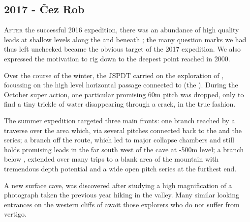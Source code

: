 \newpage
  
\begin{tcolorbox}

\chapter{2017 - Čez Rob}
	
	\lettrine{A}{fter} the successful 2016 expedition, there was an abundance of high quality leads at shallow levels along the  and beneath ; the many question marks we had thus left unchecked became the obvious target of the 2017 expedition. We also expressed the motivation to rig down to the deepest point reached in 2000.

	Over the course of the winter, the JSPDT carried on the exploration of , focussing on the high level horizontal passage connected to  (the ). During the October super action, one particular promising 60m pitch was dropped, only to find a tiny trickle of water disappearing through a crack, in the true  fashion.

	The summer expedition targeted three main fronts: one branch reached by a traverse over the  area which, via several pitches connected back to the  and the  series; a branch off the  route, which led to major collapse chambers and still holds promising leads in the far south west of the cave at -500m level; a branch below , extended over many trips to a blank area of the mountain with tremendous depth potential and a wide open pitch series at the furthest end.

	A new surface cave,  was discovered after studying a high magnification of a photograph taken the previous year hiking in the  valley. Many similar looking entrances on the western cliffs of  await those explorers who do not suffer from vertigo.

\end{tcolorbox}

